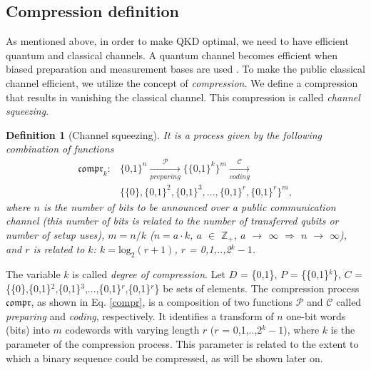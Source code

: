 \documentclass[journal,onecolumn]{IEEEtran}
\theoremstyle{thmstyleone}%
\theoremstyle{thmstyletwo}%
\theoremstyle{thmstylethree}%
\newtheorem{definition}{Definition}%
\begin{document}
	\subsection{Compression definition}
	As mentioned above, in order to make QKD optimal, we need to have efficient quantum and classical channels. A quantum channel becomes efficient when biased preparation and measurement bases are used \cite{Lo2005}. To make the public classical channel efficient, we utilize the concept of \textit{compression}. We define a compression that results in vanishing the classical channel. This compression is called \textit{channel squeezing}.
	\begin{definition}[Channel squeezing]
		It is a process given by the following combination of functions
		\begin{align}\label{compr}
			\mathfrak{compr}_k: & \{\text{0,1}\}^n \xrightarrow[preparing]{\mathcal{P}} \{\{\text{0,1}\}^k\}^m    \xrightarrow[coding]  {\mathcal{C}} \nonumber \\ & \{\{\text{0}\},\{\text{0,1}\}^{\text{2}},\{\text{0,1}\}^{\text{3}},...,\{\text{0,1}\}^r,\{\text{0,1}\}^r\}^m,
		\end{align}
		where $n$ is the number of bits to be announced over a public communication channel (this number of bits is related to the number of transferred qubits or number of setup uses), $m = n/k$ ($n=a\cdot k$, $a$ $\in$ $\mathbb{Z}_+$, $a$ $\rightarrow$ $\infty$ $\Rightarrow$ $n$ $\rightarrow$ $\infty$), and $r$ is related to $k$: $k = \text{log}_{\text{2}}(r+\text{1})$, $r$ = 0,1,..,2$^{k}-\text{1}$. \\
	\end{definition}
	The variable $k$ is called \textit{degree of compression}. Let $D$ = \{0,1\}, $P$ = \{\{0,1\}$^k$\}, $C$ = \{\{0\},\{0,1\}$^{\text{2}}$,\{0,1\}$^{\text{3}}$,...,\{0,1\}$^r$,\{0,1\}$^r$\} be sets of elements. The compression process $\mathfrak{compr}$, as shown in Eq. \eqref{compr}, is a composition of two functions $\mathcal{P}$ and $\mathcal{C}$ called \textit{preparing} and \textit{coding}, respectively. It identifies a transform of $n$ one-bit words (bits) into $m$ codewords with varying length $r$ ($r$ = 0,1,..,2$^{k}-\text{1}$), where $k$ is the parameter of the compression process. This parameter is related to the extent to which a binary sequence could be compressed, as will be shown later on.\\
\end{document}
